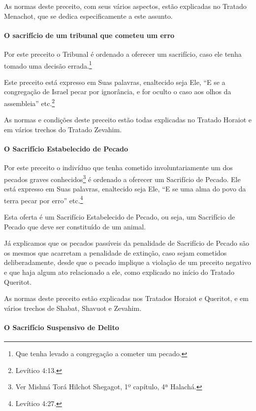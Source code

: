 \begin{multicols}{2}
As normas deste preceito, com seus vários aspectos, estão explicadas no
Tratado Menachot\starr, que se dedica especificamente a este assunto.

\paragraph{O sacrifício de um tribunal que cometeu um erro}

Por este preceito o Tribunal é ordenado a oferecer um sacrifício, caso
ele tenha tomado uma decisão errada.\footnote{Que tenha levado a congregação a cometer um pecado.}

Este preceito está expresso em Suas palavras, enaltecido seja Ele, ``E
se a congregação de Israel pecar por ignorância, e for oculto o caso aos
olhos da assembleia'' etc.\footnote{Levítico 4:13.}

As normas e condições deste preceito estão todas explicadas no Tratado
Horaiot\starr{} e em vários trechos do Tratado Zevahim\starr.

\paragraph{O Sacrifício Estabelecido de Pecado}

Por este preceito o indivíduo que
tenha cometido involuntariamente um dos pecados graves
conhecidos\footnote{Ver Mishná\starr{} Torá\starr{} Hilchot\starr{} Shegagot, 1º capítulo, 4ª Halachá\starr.} é ordenado a oferecer um Sacrifício de
Pecado. Ele está expresso em Suas palavras, enaltecido seja Ele, ``E se
uma alma do povo da terra pecar por erro'' etc.\footnote{Levítico 4:27.}

Esta oferta é um Sacrifício Estabelecido de Pecado, ou seja, um Sacrifício de Pecado que deve ser constituído de um animal.

Já explicamos que os pecados passíveis da penalidade de Sacrifício de
Pecado são os mesmos que acarretam a penalidade de extinção, caso sejam
cometidos deliberadamente, desde que o pecado implique a violação de um
preceito negativo e que haja algum ato relacionado a ele, como explicado
no início do Tratado Queritot\starr.

As normas deste preceito estão explicadas nos Tratados Horaiot\starr{} e
Queritot\starr, e em vários trechos de Shabat, Shavuot\starr{} e Zevahim\starr.

\paragraph{O Sacrifício Suspensivo de Delito}


\end{multicols}
